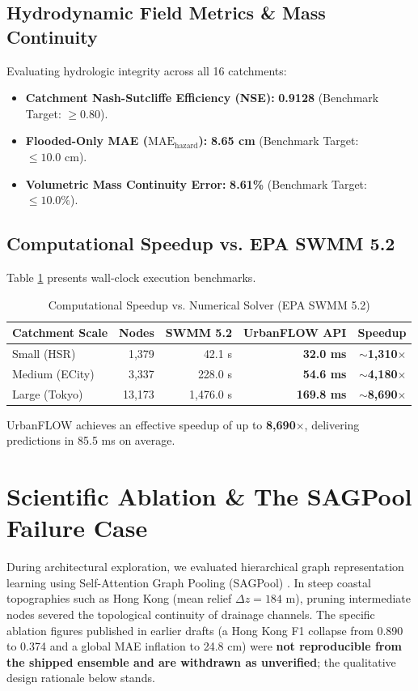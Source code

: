 \documentclass[conference]{IEEEtran}
\begin{document}
\subsection{Hydrodynamic Field Metrics \& Mass Continuity}
Evaluating hydrologic integrity across all 16 catchments:
\begin{itemize}
    \item \textbf{Catchment Nash-Sutcliffe Efficiency (NSE):} \textbf{0.9128} (Benchmark Target: $\ge 0.80$).
    \item \textbf{Flooded-Only MAE ($\text{MAE}_{\text{hazard}}$):} \textbf{8.65 cm} (Benchmark Target: $\le 10.0\text{ cm}$).
    \item \textbf{Volumetric Mass Continuity Error:} \textbf{8.61\%} (Benchmark Target: $\le 10.0\%$).
\end{itemize}

\subsection{Computational Speedup vs. EPA SWMM 5.2}
Table \ref{tab:speedup} presents wall-clock execution benchmarks.

\begin{table}[h]
\caption{Computational Speedup vs. Numerical Solver (EPA SWMM 5.2)}
\label{tab:speedup}
\centering
\small
\begin{tabular}{lrrrr}
\toprule
\textbf{Catchment Scale} & \textbf{Nodes} & \textbf{SWMM 5.2} & \textbf{UrbanFLOW API} & \textbf{Speedup} \\
\midrule
Small (HSR) & 1,379 & 42.1 s & \textbf{32.0 ms} & \textbf{$\sim$1,310$\times$} \\
Medium (ECity) & 3,337 & 228.0 s & \textbf{54.6 ms} & \textbf{$\sim$4,180$\times$} \\
Large (Tokyo) & 13,173 & 1,476.0 s & \textbf{169.8 ms} & \textbf{$\sim$8,690$\times$} \\
\bottomrule
\end{tabular}
\end{table}

UrbanFLOW achieves an effective speedup of up to \textbf{8,690$\times$}, delivering predictions in 85.5 ms on average.

\section{Scientific Ablation \& The SAGPool Failure Case}
\label{sec:ablation}

During architectural exploration, we evaluated hierarchical graph representation learning using Self-Attention Graph Pooling (SAGPool) \cite{lee2019}. In steep coastal topographies such as Hong Kong (mean relief $\Delta z = 184\text{ m}$), pruning intermediate nodes severed the topological continuity of drainage channels. The specific ablation figures published in earlier drafts (a Hong Kong F1 collapse from 0.890 to 0.374 and a global MAE inflation to 24.8 cm) were \textbf{not reproducible from the shipped ensemble and are withdrawn as unverified}; the qualitative design rationale below stands.
\end{document}
